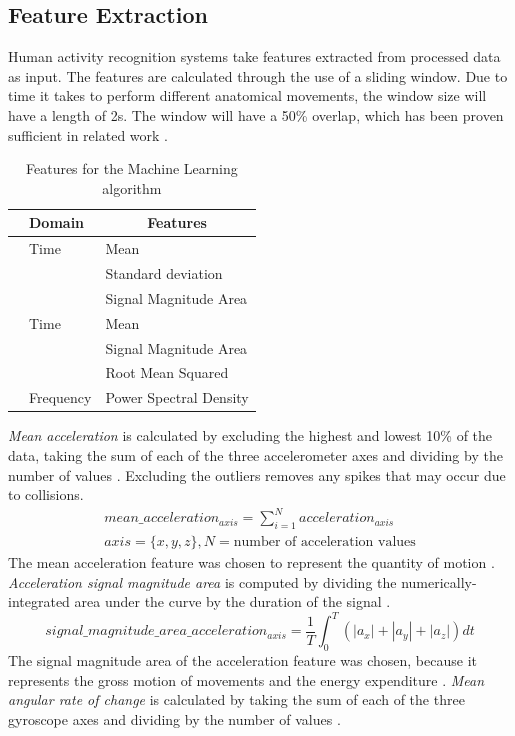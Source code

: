 \subsection{Feature Extraction}
\label{sec:Approach:Feature-Extraction}
Human activity recognition systems take features extracted from processed data as input. The features are calculated through the use of a sliding window. Due to time it takes to perform different anatomical movements, the window size will have a length of 2s. The window will have a 50\% overlap, which has been proven sufficient in related work \cite{Wannenburg2016}.
\begin{table}[h]
	\centering
	\begin{tabular}{c|l|l}
		& \multicolumn{1}{l|}{Domain} & \multicolumn{1}{c}{Features} \\
		\hline
		\parbox[t]{2mm}{} & Time & Mean\\
		&& Standard deviation\\
		&& Signal Magnitude Area\\
		\hline
		\parbox[t]{2mm}{} & Time & Mean\\
		&& Signal Magnitude Area \\
		&& Root Mean Squared \\
		& Frequency & Power Spectral Density \\
	\end{tabular}
	\caption{Features for the Machine Learning algorithm}
	\label{tab:features}
\end{table}
\emph{Mean acceleration} is calculated by excluding the highest and lowest 10\% of the data, taking the sum of each of the three accelerometer axes and dividing by the number of values \cite{Totty2017}. Excluding the outliers removes any spikes that may occur due to collisions.
\begin{align*}
mean\_acceleration_{axis} = \sum_{i=1}^{N}acceleration_{axis}\\
axis = \{x,y,z\}, N = \text{number of acceleration values}
\end{align*}
The mean acceleration feature was chosen to represent the quantity of motion \cite{Arif2015}. \emph{Acceleration signal magnitude area} is computed by dividing the numerically-integrated area under the curve by the duration of the signal \cite{Totty2017}.
$$ signal\_magnitude\_area\_acceleration_{axis}= \frac{1}{T}\int_{0}^{T}(|a_x|+|a_y|+|a_z|)dt$$
The signal magnitude area of the acceleration feature was chosen, because it represents the gross motion of movements and the energy expenditure \cite{Jeran2016}. \emph{Mean angular rate of change} is calculated by taking the sum of each of the three gyroscope axes and dividing by the number of values \cite{Totty2017}.
